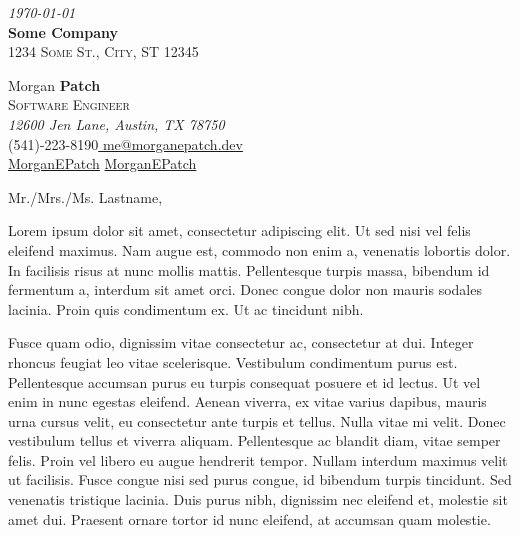 \documentclass[11pt, letterpaper]{article}
\makeatletter
\def\firstname{Morgan}
\def\lastname{Patch}
\def\position{Software Engineer}
\def\address{12600 Jen Lane, Austin, TX 78750}
\def\mobile{(541)-223-8190}
\def\email{me@morganepatch.dev}
\def\github{MorganEPatch}
\def\linkedin{MorganEPatch}
\def\recipient{Some Company}
\def\recipientaddress{1234 Some St., City, ST 12345}
\def\letterdate{\today}
\makeatother
\begin{document}
\begin{minipage}{0.5\textwidth}
    \raggedright
    {\fontsize{12pt}{1em}\sourcesansprolight\slshape\color{gray} \letterdate}\\
    \smallskip
    {\fontsize{14pt}{1em}\bfseries\color{darkgray} \recipient}\\
    {\fontsize{10pt}{1em}\scshape\color{gray} \recipientaddress}
\end{minipage}
\begin{minipage}[c]{0.5\textwidth}
    \raggedleft
    {\fontsize{32pt}{1em}\sourcesansprolight\color{gray} \firstname}\space
    {\fontsize{32pt}{1em}\bfseries\color{darkgray} \lastname}\\
    {\fontsize{12pt}{1em}\scshape\color{purple} \position}\\
    {\fontsize{8pt}{1em}\itshape\color{lightgray} \address}\\
    {\fontsize{6pt}{1em}\color{darkgray}  \mobile \quad\textbar\quad \href{mailto:\email}{ \email} \\ \href{https://github.com/\github}{ \github} \quad\textbar\quad \href{https://linkedin.com/in/\linkedin}{ \linkedin}}
\end{minipage}

\onehalfspacing
\bigskip

Mr./Mrs./Ms. Lastname,

Lorem ipsum dolor sit amet, consectetur adipiscing elit. Ut sed nisi vel felis eleifend maximus. Nam augue est, commodo non enim a, venenatis lobortis dolor. In facilisis risus at nunc mollis mattis. Pellentesque turpis massa, bibendum id fermentum a, interdum sit amet orci. Donec congue dolor non mauris sodales lacinia. Proin quis condimentum ex. Ut ac tincidunt nibh.

Fusce quam odio, dignissim vitae consectetur ac, consectetur at dui. Integer rhoncus feugiat leo vitae scelerisque. Vestibulum condimentum purus est. Pellentesque accumsan purus eu turpis consequat posuere et id lectus. Ut vel enim in nunc egestas eleifend. Aenean viverra, ex vitae varius dapibus, mauris urna cursus velit, eu consectetur ante turpis et tellus. Nulla vitae mi velit. Donec vestibulum tellus et viverra aliquam. Pellentesque ac blandit diam, vitae semper felis. Proin vel libero eu augue hendrerit tempor. Nullam interdum maximus velit ut facilisis. Fusce congue nisi sed purus congue, id bibendum turpis tincidunt. Sed venenatis tristique lacinia. Duis purus nibh, dignissim nec eleifend et, molestie sit amet dui. Praesent ornare tortor id nunc eleifend, at accumsan quam molestie.
\end{document}
